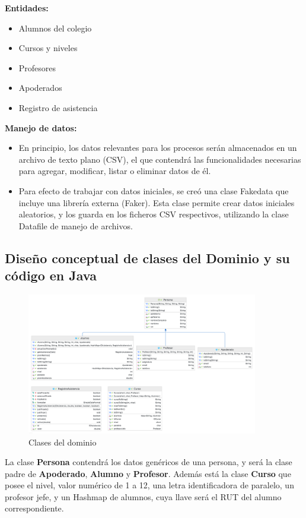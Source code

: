\textbf{Entidades:}
\begin{itemize}
    \item Alumnos del colegio
    \item Cursos y niveles
    \item Profesores
    \item Apoderados
    \item Registro de asistencia
\end{itemize}
	
\textbf{Manejo de datos:}
\begin{itemize}
    \item En principio, los datos relevantes para los procesos serán almacenados en un archivo de texto plano (CSV), el que contendrá las funcionalidades necesarias para agregar, modificar, listar o eliminar datos de él.
    \item Para efecto de trabajar con datos iniciales, se creó una clase Fakedata que incluye una librería externa (Faker). Esta clase permite crear datos iniciales aleatorios, y los guarda en los ficheros CSV respectivos, utilizando la clase Datafile de manejo de archivos.
\end{itemize}

\clearpage

\subsection{Diseño conceptual de clases del Dominio y su código en Java}

\begin{figure}[h]
    \centering
    \includegraphics[width=0.9\textwidth]{contents/img/img1}
    \caption{Clases del dominio}
    \label{fig:img1}
\end{figure}

La clase \textbf{Persona} contendrá los datos genéricos de una persona, y será la clase padre de \textbf{Apoderado}, \textbf{Alumno} y \textbf{Profesor}. Además está la clase \textbf{Curso} que posee el nivel, valor numérico de 1 a 12, una letra identificadora de paralelo, un profesor jefe, y un Hashmap de alumnos, cuya llave será el RUT del alumno correspondiente.\\


